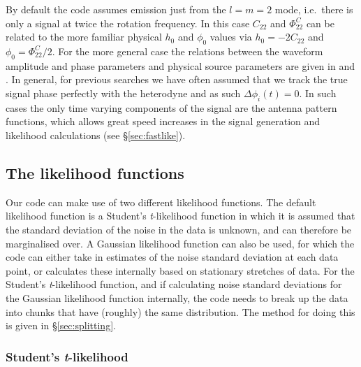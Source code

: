By default the code assumes emission just from the $l=m=2$ mode, i.e.\ there is only a signal at twice the
rotation frequency. In this case $C_{22}$ and $\Phi_{22}^C$ can be related to the more familiar physical
$h_0$ and $\phi_0$ values via $h_0 = -2C_{22}$ \citep[where the minus sign maintains consistency of equation~\ref{eq:h2f} with the form given in][]{1998PhRvD..58f3001J} and $\phi_0 = \Phi_{22}^C/2$. For the more general case the
relations between the waveform amplitude and phase parameters and physical source parameters are given in
\citet{2015arXiv150105832J} and \citet{2015MNRAS.453.4399P}. In general, for previous searches we have often assumed that we track the true
signal phase perfectly with the heterodyne and as such $\Delta\phi_i(t) = 0$. In such cases the only time
varying components of the signal are the antenna pattern functions, which allows great speed increases in the
signal generation and likelihood calculations (see \S\ref{sec:fastlike}).

\subsection{The likelihood functions}\label{sec:likelihood}

Our code can make use of two different likelihood functions. The default likelihood function is a
Student's {\it t}-likelihood function in which it is assumed that the standard deviation of the noise in the
data is unknown, and can therefore be marginalised over. A Gaussian likelihood function can also be used, for
which the code can either take in estimates of the noise standard deviation at each data point, or calculates
these internally based on stationary stretches of data. For the Student's {\it t}-likelihood function, and if
calculating noise standard deviations for the Gaussian likelihood function internally, the code needs to break
up the data into chunks that have (roughly) the same distribution. The method for doing this is given in
\S\ref{sec:splitting}.

\subsubsection{Student's {\it t}-likelihood}\label{sec:stlikelihood}


